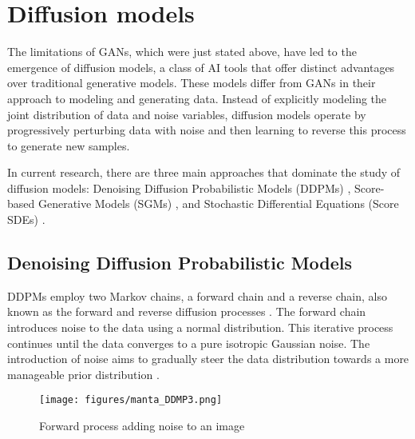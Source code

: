 \section{Diffusion models}
\label{diffusion Models}

The limitations of GANs, which were just stated above, have led to the emergence of diffusion models, a class of AI tools that offer distinct advantages over traditional generative models. These models differ from GANs in their approach to modeling and generating data.  Instead of explicitly modeling the joint distribution of data and noise variables, diffusion models operate by progressively perturbing data with noise and then learning to reverse this process to generate new samples.

In current research, there are three main approaches that dominate the study of diffusion models: Denoising Diffusion Probabilistic Models (DDPMs) \citep{hoDDPMs}, Score-based Generative Models (SGMs) \citep{song2019SGM}, and Stochastic Differential Equations (Score SDEs) \citep{song2020score, song2021maximum}.


\subsection{Denoising Diffusion Probabilistic Models}
DDPMs employ two Markov chains, a forward chain and a reverse chain, also known as the forward and reverse diffusion processes \citep{sohlDDPM}. The forward chain introduces noise to the data using a normal distribution. This iterative process continues until the data converges to a pure isotropic Gaussian noise. The introduction of noise aims to gradually steer the data distribution towards a more manageable prior distribution \citep{yangdiffusionSummary, pooleDreamfusion}. 

\begin{figure}[ht]
\centering
  \texttt{[image: figures/manta\_DDMP3.png]}
  \caption{Forward process adding noise to an image}
  \label{fig:figureDDPM}
\end{figure}


